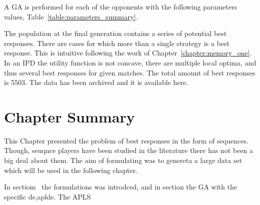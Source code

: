 A GA is performed for each of the opponents with the following parameters values,
Table~\ref{table:parameters_summary}.

\begin{table}[!htbp]
    \begin{center}
    \end{center}
    \caption{The parameters of the genetic algorithm.}\label{table:parameters_summary}
\end{table}

The population at the final generation contains a series of potential best
responses. There are cases for which more than a single strategy is a best
response. This is intuitive following the work of
Chapter~\ref{chapter:memory_one}. In an IPD the utility function is not concave,
there are multiple local optima, and thus several best responses for given
matches. The total amount of best responses is 5503. The data has been archived
and it is available here.

\section{Chapter Summary}

This Chapter presented the problem of best responses in the form of sequences.
Though, seuqnce players have been studied in the literature there has not been
a big deal about them. The aim of formulating was to genereta a large data set
which will be used in the following chapter.

In sectiom~ the formulations was introdced, and in section the GA with the specific
de,aplde. The APLS 